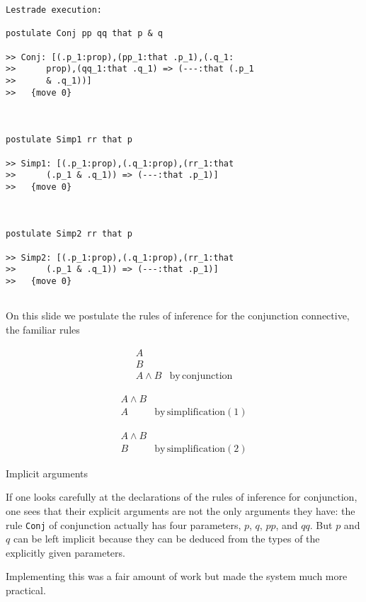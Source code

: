 \documentclass{slides}
\begin{document}
\begin{slide}

{\small \begin{verbatim}Lestrade execution:

postulate Conj pp qq that p & q

>> Conj: [(.p_1:prop),(pp_1:that .p_1),(.q_1:
>>      prop),(qq_1:that .q_1) => (---:that (.p_1
>>      & .q_1))]
>>   {move 0}



postulate Simp1 rr that p

>> Simp1: [(.p_1:prop),(.q_1:prop),(rr_1:that
>>      (.p_1 & .q_1)) => (---:that .p_1)]
>>   {move 0}



postulate Simp2 rr that p

>> Simp2: [(.p_1:prop),(.q_1:prop),(rr_1:that
>>      (.p_1 & .q_1)) => (---:that .p_1)]
>>   {move 0}


\end{verbatim}}

\end{slide}

\begin{slide}

On this slide we postulate the rules of inference for the conjunction connective, the familiar rules

$$\begin{array}{cc}
A & \\

B & \\ \hline

A \wedge B& \mathrm{by \,  conjunction}\end{array}$$

$$\begin{array}{cc}

A \wedge B & \\ \hline

A & \mathrm{by \, simplification(1)}\end{array}$$

$$\begin{array}{cc}

A \wedge B & \\ \hline

B & \mathrm{by \, simplification(2)}\end{array}$$

\end{slide}

\begin{slide}

{\Large Implicit arguments}

If one looks carefully at the declarations of the rules of inference for conjunction, one sees that their explicit arguments are not the only arguments they have:
the rule {\tt Conj} of conjunction actually has four parameters, $p$, $q$, $pp$, and $qq$.  But $p$ and $q$ can be left implicit because they can be deduced from the types of the explicitly given parameters.

Implementing this was a fair amount of work but made the system much more practical.

\end{slide}
\end{document}
